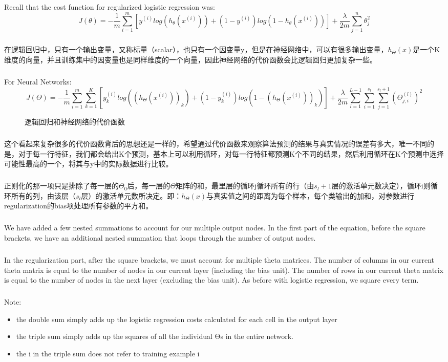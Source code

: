 \documentclass{article}
\begin{document}
\begin{CJK}{UTF8}{gbsn}
\subparagraph{}
Recall that the cost function for regularized logistic regression was:
\begin{equation}
J(\theta)=-\frac{1}{m}\sum_{i=1}^m[y^{(i)}log(h_\theta(x^{(i)}))+(1-y^{(i)})log(1-h_\theta(x^{(i)}))]+\frac{\lambda}{2m}\sum_{j=1}^n\theta_j^2
\end{equation}
\subparagraph{}
在逻辑回归中，只有一个输出变量，又称标量（scalar），也只有一个因变量y，但是在神经网络中，可以有很多输出变量，$h_\Theta(x)$是一个K维度的向量，并且训练集中的因变量也是同样维度的一个向量，因此神经网络的代价函数会比逻辑回归更加复杂一些。
\subparagraph{}
For Neural Networks:
\begin{equation}
J(\Theta)=-\frac{1}{m}\sum_{i=1}^m\sum_{k=1}^K[y_k^{(i)}log((h_\Theta(x^{(i)}))_k)+(1-y_k^{(i)})log(1-(h_\Theta(x^{(i)}))_k)]+\frac{\lambda}{2m}\sum_{l=1}^{L-1}\sum_{i=1}^{s_l}\sum_{j=1}^{s_l+1}(\Theta_{j,i}^{(l)})^2
\end{equation}
\begin{figure}[H]
\caption{逻辑回归和神经网络的代价函数}
\label{fig:503}
\end{figure}
\subparagraph{}
这个看起来复杂很多的代价函数背后的思想还是一样的，希望通过代价函数来观察算法预测的结果与真实情况的误差有多大，唯一不同的是，对于每一行特征，我们都会给出K个预测，基本上可以利用循环，对每一行特征都预测K个不同的结果，然后利用循环在K个预测中选择可能性最高的一个，将其与y中的实际数据进行比较。
\subparagraph{}
正则化的那一项只是排除了每一层的$\Theta_0$后，每一层的$\Theta$矩阵的和，最里层的循环j循环所有的行（由$s_l+1$层的激活单元数决定），循环i则循环所有的列，由该层（$s_l$层）的激活单元数所决定。即：$h_\Theta(x)$与真实值之间的距离为每个样本，每个类输出的加和，对参数进行regularization的bias项处理所有参数的平方和。
\subparagraph{}
We have added a few nested summations to account for our multiple output nodes. In the first part of the equation, before the square brackets, we have an additional nested summation that loops through the number of output nodes.
\subparagraph{}
In the regularization part, after the square brackets, we must account for multiple theta matrices. The number of columns in our current theta matrix is equal to the number of nodes in our current layer (including the bias unit). The number of rows in our current theta matrix is equal to the number of nodes in the next layer (excluding the bias unit). As before with logistic regression, we square every term.
\subparagraph{}
Note:
\begin{itemize}
\item the double sum simply adds up the logistic regression costs calculated for each cell in the output layer
\item the triple sum simply adds up the squares of all the individual Θs in the entire network.
\item the i in the triple sum does not refer to training example i
\end{itemize}

\end{CJK}
\end{document}
